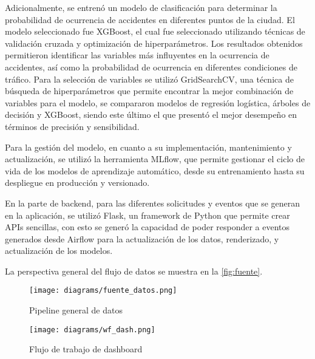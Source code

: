 \documentclass[12pt]{article}
\begin{document}
Adicionalmente, se entrenó un modelo de clasificación para determinar la probabilidad de ocurrencia de accidentes en diferentes puntos de la ciudad. El modelo seleccionado fue XGBoost, el cual fue seleccionado utilizando técnicas de validación cruzada y optimización de hiperparámetros. Los resultados obtenidos permitieron identificar las variables más influyentes en la ocurrencia de accidentes, así como la probabilidad de ocurrencia en diferentes condiciones de tráfico. Para la selección de variables se utilizó GridSearchCV, una técnica de búsqueda de hiperparámetros que permite encontrar la mejor combinación de variables para el modelo, se compararon modelos de regresión logística, árboles de decisión y XGBoost, siendo este último el que presentó el mejor desempeño en términos de precisión y sensibilidad.

Para la gestión del modelo, en cuanto a su implementación, mantenimiento y actualización, se utilizó la herramienta MLflow, que permite gestionar el ciclo de vida de los modelos de aprendizaje automático, desde su entrenamiento hasta su despliegue en producción y versionado.

En la parte de backend, para las diferentes solicitudes y eventos que se generan en la aplicación, se utilizó Flask, un framework de Python que permite crear APIs sencillas, con esto se generó la capacidad de poder responder a eventos generados desde Airflow para la actualización de los datos, renderizado, y actualización de los modelos.

La perspectiva general del flujo de datos se muestra en la \autoref{fig:fuente}.

\begin{figure}[H]
    \centering
    \texttt{[image: diagrams/fuente\_datos.png]}
    \caption{Pipeline general de datos}
    \label{fig:fuente}
\end{figure}

\begin{figure}[H]
    \centering
    \texttt{[image: diagrams/wf\_dash.png]}
    \caption{Flujo de trabajo de dashboard}
    \label{fig:wf_dash}
\end{figure}


\printbibliography
\end{document}
